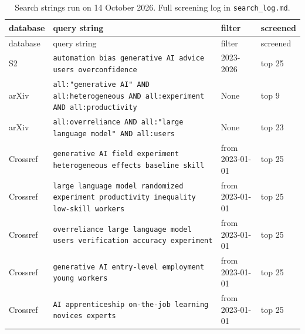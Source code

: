 \small\begin{longtable}{p{}p{}p{}p{}}
\caption{Search strings run on 14 October 2026. Full screening log in \texttt{search\_log.md}.}\label{tab:search}\\
\toprule database & query string & filter & screened\\ \midrule\endfirsthead\toprule database & query string & filter & screened\\ \midrule\endhead
S2 & \texttt{automation bias generative AI advice users overconfidence} & 2023-2026 & top 25\\
arXiv & \texttt{all:"generative AI" AND all:heterogeneous AND all:experiment AND all:productivity} & None & top 9\\
arXiv & \texttt{all:overreliance AND all:"large language model" AND all:users} & None & top 23\\
Crossref & \texttt{generative AI field experiment heterogeneous effects baseline skill} & from 2023-01-01 & top 25\\
Crossref & \texttt{large language model randomized experiment productivity inequality low-skill workers} & from 2023-01-01 & top 25\\
Crossref & \texttt{overreliance large language model users verification accuracy experiment} & from 2023-01-01 & top 25\\
Crossref & \texttt{generative AI entry-level employment young workers} & from 2023-01-01 & top 25\\
Crossref & \texttt{AI apprenticeship on-the-job learning novices experts} & from 2023-01-01 & top 25\\
\bottomrule\end{longtable}
